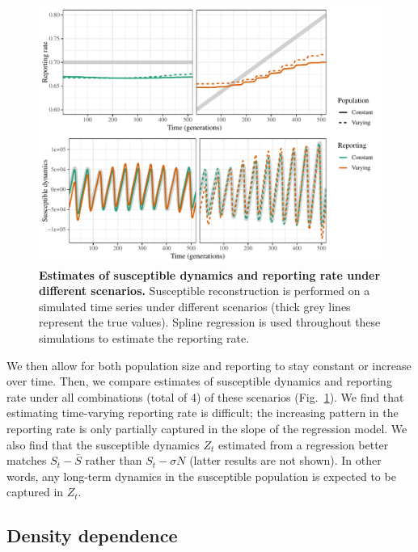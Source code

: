 \documentclass{article}
\newcommand{\fref}[1]{Fig.~\ref{fig:#1}}
\begin{document}
\begin{figure}[!t]
\includegraphics[width=\textwidth]{../figure/susceptible_reconstruction_compare.pdf}
\caption{
\textbf{Estimates of susceptible dynamics and reporting rate under different scenarios.}
Susceptible reconstruction is performed on a simulated time series under different scenarios (thick grey lines represent the true values).
Spline regression is used throughout these simulations to estimate the reporting rate.
}
\label{fig:tsircomp}
\end{figure}

We then allow for both population size and reporting to stay constant or increase over time.
Then, we compare estimates of susceptible dynamics and reporting rate under all combinations (total of 4) of these scenarios (\fref{tsircomp}).
We find that estimating time-varying reporting rate is difficult;
the increasing pattern in the reporting rate is only partially captured in the slope of the regression model.
We also find that the susceptible dynamics $Z_t$ estimated from a regression better matches $S_t - \bar{S}$ rather than $S_t - \sigma N$ (latter results are not shown).
In other words, any long-term dynamics in the susceptible population is expected to be captured in $Z_t$.

\subsection{Density dependence}
\end{document}
